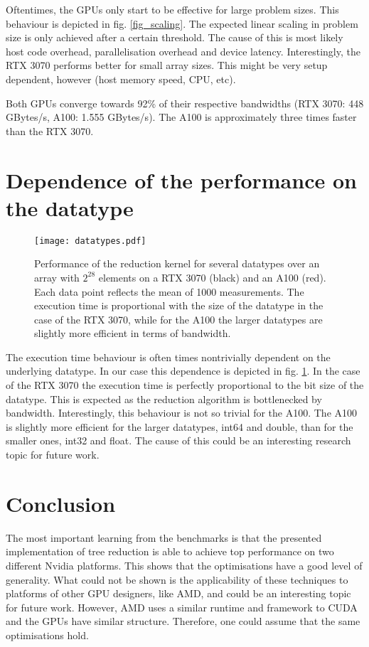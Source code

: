 Oftentimes, the GPUs only start to be effective for large problem sizes.
This behaviour is depicted in fig. \ref{fig_scaling}.
The expected linear scaling in problem size is only achieved after a certain threshold.
The cause of this is most likely host code overhead, parallelisation overhead and device latency.
Interestingly, the RTX 3070 performs better for small array sizes.
This might be very setup dependent, however (host memory speed, CPU, etc).

Both GPUs converge towards 92\% of their respective bandwidths (RTX 3070: 448 GBytes/s, A100: 1.555 GBytes/s).
The A100 is approximately three times faster than the RTX 3070.

\section{Dependence of the performance on the datatype}

\begin{figure} \label{fig_datatypes}
    \centering
    \texttt{[image: datatypes.pdf]}
    \caption{
        Performance of the reduction kernel for several datatypes over an array with \( 2^{28} \) elements on a RTX 3070 (black) and an A100 (red).
        Each data point reflects the mean of 1000 measurements.
        The execution time is proportional with the size of the datatype in the case of the RTX 3070,
        while for the A100 the larger datatypes are slightly more efficient in terms of bandwidth.
    }
\end{figure}

The execution time behaviour is often times nontrivially dependent on the underlying datatype.
In our case this dependence is depicted in fig. \ref{fig_datatypes}.
In the case of the RTX 3070 the execution time is perfectly proportional to the bit size of the datatype.
This is expected as the reduction algorithm is bottlenecked by bandwidth.
Interestingly, this behaviour is not so trivial for the A100.
The A100 is slightly more efficient for the larger datatypes, int64 and double, than for the smaller ones, int32 and float.
The cause of this could be an interesting research topic for future work.

\section{Conclusion}
The most important learning from the benchmarks is that the presented implementation of tree reduction is able to achieve top performance on two different Nvidia platforms.
This shows that the optimisations have a good level of generality. 
What could not be shown is the applicability of these techniques to platforms of other GPU designers, like AMD, and could be an interesting topic for future work.
However, AMD uses a similar runtime and framework to CUDA and the GPUs have similar structure.
Therefore, one could assume that the same optimisations hold.
